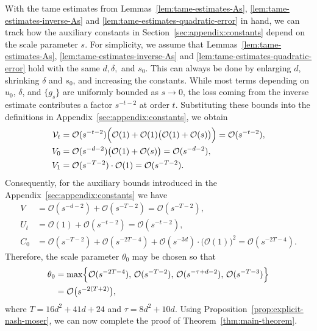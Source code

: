 \documentclass[11pt]{amsart}
\renewcommand{\O}{\mathcal{O}}
\begin{document}
With the tame estimates from Lemmas~\ref{lem:tame-estimates-As},
\ref{lem:tame-estimates-inverse-As} and \ref{lem:tame-estimates-quadratic-error} in hand,
we can track how the auxiliary constants in
Section~\ref{sec:appendix:constants} depend on the scale parameter \(s\).
For simplicity, we assume that Lemmas~\ref{lem:tame-estimates-As}, \ref{lem:tame-estimates-inverse-As} and \ref{lem:tame-estimates-quadratic-error} hold with the same $d,\delta,$ and $s_0$. 
This can always be done by enlarging $d$, shrinking $\delta$ and $s_0$, and increasing the constants.
While most terms depending on \(u_0\), \(\delta\),
and \(\{g_s\}\) are uniformly bounded as \(s\to 0\), the loss coming from the inverse estimate contributes a factor
\(s^{-t-2}\) at order \(t\).
Substituting these bounds into the definitions in
Appendix~\ref{sec:appendix:constants}, we obtain
\[
\begin{aligned}
	\mathcal V_t
	&= \O(s^{-t-2})\Bigl(\O(1)+\O(1)\bigl(\O(1)+\O(s)\bigr)\Bigr)
	= \O(s^{-t-2}),\\
	V_0
	&= \O(s^{-d-2})\bigl(\O(1)+\O(s)\bigr)
	= \O(s^{-d-2}),\\
	V_1
	&= \O(s^{-T-2})\cdot \O(1)
	= \O(s^{-T-2}).
\end{aligned}
\]
Consequently, for the auxiliary bounds introduced in the Appendix~\ref{sec:appendix:constants} we have
\[
\begin{aligned}
	V
	&= \O(s^{-d-2})+\O(s^{-T-2})
	= \O(s^{-T-2}),\\
	U_t
	&= \O(1)+\O(s^{-t-2})
	= \O(s^{-t-2}),\\
	C_0
	&= \O(s^{-T-2})+\O(s^{-2T-4})
	+\O(s^{-3d})\cdot\bigl(\O(1)\bigr)^2
	= \O(s^{-2T-4}).
\end{aligned}
\]
Therefore, the scale parameter \(\theta_0\) may be chosen so that
\[
\begin{aligned}
	\theta_0
	&= \max\Bigl\{\O(s^{-2T-4}),\,\O(s^{-T-2}),\,\O(s^{-\tau+d-2}),\,\O(s^{-T-3})\Bigr\}\\
	&= \O\bigl(s^{-2(T+2)}\bigr),
\end{aligned}
\]
where \(T = 16d^2+41d+24\) and \(\tau = 8d^2+10d\).
Using Proposition~\ref{prop:explicit-nash-moser}, we can now complete the proof of
Theorem~\ref{thm:main-theorem}.
\end{document}
